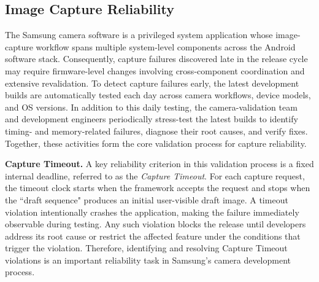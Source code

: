 \subsection{Image Capture Reliability}
\label{sec:release-process}
The Samsung camera software is a privileged system application whose image-capture workflow spans multiple system-level components across the Android software stack.
Consequently, capture failures discovered late in the release cycle may require firmware-level changes involving cross-component coordination and extensive revalidation.
To detect capture failures early, the latest development builds are automatically tested each day across camera workflows, device models, and OS versions.
In addition to this daily testing, the camera-validation team and development engineers periodically stress-test the latest builds to identify timing- and memory-related failures, diagnose their root causes, and verify fixes.
Together, these activities form the core validation process for capture reliability.

\smallskip\noindent\textbf{Capture Timeout.}
A key reliability criterion in this validation process is a fixed internal deadline, referred to as the \emph{Capture Timeout}.
For each capture request, the timeout clock starts when the framework accepts the request and stops when the ``draft sequence" produces an initial user-visible draft image.
A timeout violation intentionally crashes the application, making the failure immediately observable during testing.
Any such violation blocks the release until developers address its root cause or restrict the affected feature under the conditions that trigger the violation.
Therefore, identifying and resolving Capture Timeout violations is an important reliability task in Samsung's camera development process.